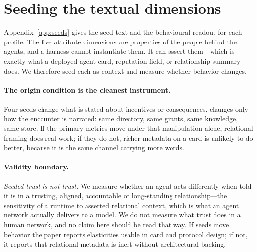 \section{Seeding the textual dimensions}
\label{sec:seeding}

Appendix~\ref{app:seeds} gives the seed text and the behavioural readout for each
profile. The five attribute dimensions are properties of the people behind the agents, and a
harness cannot instantiate them. It can assert them---which is exactly what a
deployed agent card, reputation field, or relationship summary does. We therefore
seed each as context and measure whether behavior changes.


\paragraph{The origin condition is the cleanest instrument.} Four seeds change what is
stated about incentives or consequences.  changes only how
the encounter is narrated: same directory, same grants, same knowledge, same store. If
the primary metrics move under that manipulation alone, relational framing does real
work; if they do not, richer metadata on a card is unlikely to do better, because it is
the same channel carrying more words.

\paragraph{Validity boundary.} \emph{Seeded trust is not trust.} We measure whether an
agent acts differently when told it is in a trusting, aligned, accountable or
long-standing relationship---the sensitivity of a runtime to asserted relational
context, which is what an agent network actually delivers to a model. We do not measure
what trust does in a human network, and no claim here should be read that way. If seeds
move behavior the paper reports elasticities usable in card and protocol design; if not,
it reports that relational metadata is inert without architectural backing.
